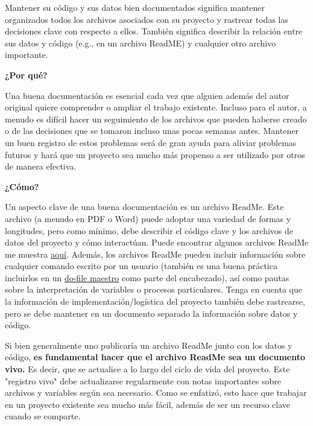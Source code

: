 \documentclass[11pt,en]{elegantpaper}
\begin{document}
\begin{enumerate}
Mantener su código y sus datos bien documentados significa mantener organizados todos los archivos asociados con su proyecto y rastrear todas las decisiones clave con respecto a ellos. También significa describir la relación entre sus datos y código (e.g., en un archivo ReadME) y cualquier otro archivo importante.

\noindent
\textbf{¿Por qué?}

Una buena documentación es esencial cada vez que alguien además del autor original quiere comprender o ampliar el trabajo existente. Incluso para el autor, a menudo es difícil hacer un seguimiento de los archivos que pueden haberse creado o de las decisiones que se tomaron incluso unas pocas semanas antes. Mantener un buen registro de estos problemas será de gran ayuda para aliviar problemas futuros y hará que un proyecto sea mucho más propenso a ser utilizado por otros de manera efectiva.

\noindent
\textbf{¿Cómo?}

Un aspecto clave de una buena documentación es un archivo ReadMe. Este archivo (a menudo en PDF o Word) puede adoptar una variedad de formas y longitudes, pero como mínimo, debe describir el código clave y los archivos de datos del proyecto y cómo interactúan. Puede encontrar algunos archivos ReadMe me muestra \href{http://www.poverty-action.org/research-transparency/example-readme-files}{aquí}. Además, los archivos ReadMe pueden incluir información sobre cualquier comando escrito por un usuario (también es una buena práctica incluirlos en un \href{http://www.poverty-action.org/research-transparency/example-master}{do-file maestro} como parte del encabezado), así como pautas sobre la interpretación de variables o procesos particulares. Tenga en cuenta que la información de implementación/logística del proyecto también debe rastrearse, pero se debe mantener en un documento separado la información sobre datos y código.

Si bien generalmente uno publicaría un archivo ReadMe junto con los datos y código, \textbf{es fundamental hacer que el archivo ReadMe sea un documento vivo.} Es decir, que se actualice a lo largo del ciclo de vida del proyecto. Este "registro vivo" debe actualizarse regularmente con notas importantes sobre archivos y variables según sea necesario. Como se enfatizó, esto hace que trabajar en un proyecto existente sea mucho más fácil, además de ser un recurso clave cuando se comparte.


\end{enumerate}
\end{document}
